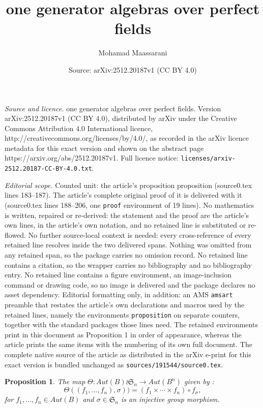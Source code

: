 \documentclass[10pt,a4paper]{amsart}
\title{one generator algebras over perfect fields}
\author{Mohamad Maassarani}
\date{Source: arXiv:2512.20187v1 (CC BY 4.0)}
\newtheorem{proposition}{Proposition}
\begin{document}
\maketitle

\noindent\emph{Source and licence.} one generator algebras over perfect fields. Version arXiv:2512.20187v1 (CC BY 4.0), distributed by arXiv under the Creative Commons Attribution 4.0 International licence, http://creativecommons.org/licenses/by/4.0/, as recorded in the arXiv licence metadata for this exact version and shown on the abstract page https://arxiv.org/abs/2512.20187v1. Full licence notice: \texttt{licenses/arxiv-2512.20187-CC-BY-4.0.txt}.\par\smallskip

\noindent\textit{Editorial scope.} Counted unit: the article's proposition proposition (source0.tex lines 183--187). The article's complete original proof of it is delivered with it (source0.tex lines 188--206, one \texttt{proof} environment of 19 lines). No mathematics is written, repaired or re-derived: the statement and the proof are the article's own lines, in the article's own notation, and no retained line is substituted or re-flowed.  No further source-local context is needed: every cross-reference of every retained line resolves inside the two delivered spans.  Nothing was omitted from any retained span, so the package carries no omission record.  No retained line contains a citation, so the wrapper carries no bibliography and no bibliography entry.  No retained line contains a figure environment, an image-inclusion command or drawing code, so no image is delivered and the package declares no asset dependency.  Editorial formatting only, in addition: an AMS \texttt{amsart} preamble that restates the article's own declarations and macros used by the retained lines, namely the environments \texttt{proposition} on separate counters, together with the standard packages those lines need.  The retained environments print in this document as Proposition 1 in order of appearance, whereas the article prints the same items with the numbering of its own full document.  The complete native source of the article as distributed in the arXiv e-print for this exact version is bundled unchanged as \texttt{sources/191544/source0.tex}.
\begin{proposition}
The map $\Theta : Aut(B) \wr \mathfrak{S}_n \to Aut(B^n)$ given by : 
$$ \Theta((f_1,\dots,f_n),\sigma))=(f_1\times \cdots \times f_n)\circ f_\sigma,$$
for $f_1,\dots , f_n\in Aut(B)$ and $\sigma \in \mathfrak{S}_n$ is an injective group morphism.
\end{proposition}
\end{document}
